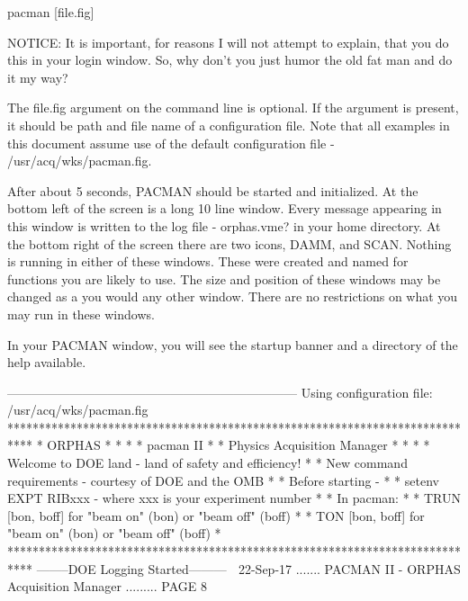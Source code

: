          pacman [file.fig]
 
     NOTICE:  It is important, for reasons I will not attempt to explain, that
          you do this in your login window. So, why don't you just  humor  the
          old fat man and do it my way?
 
   The  file.fig  argument on the command line is optional. If the argument is
   present, it should be path and file name  of  a  configuration  file.  Note
   that  all examples in this document assume use of the default configuration
   file - /usr/acq/wks/pacman.fig.
 
   After about 5 seconds, PACMAN should be started  and  initialized.  At  the
   bottom left of the screen is a long 10 line window. Every message appearing
   in  this  window  is  written  to  the  log file - orphas.vme? in your home
   directory. At the bottom right of the screen there  are  two  icons,  DAMM,
   and  SCAN.  Nothing  is  running  in  either  of  these windows. These were
   created and named for functions  you  are  likely  to  use.  The  size  and
   position  of  these windows may be changed as a you would any other window.
   There are no restrictions on what you may run in these windows.
 
   In your PACMAN window, you will see the startup banner and a  directory  of
   the help available.
 
     ---------------------------------------------------------------------
   Using configuration file: /usr/acq/wks/pacman.fig
   ****************************************************************************
   *                                ORPHAS                                    *
   *                                                                          *
   *                               pacman II                                  *
   *                      Physics Acquisition Manager                         *
   *                                                                          *
   *     Welcome to DOE land - land of safety and efficiency!                 *
   * New command requirements - courtesy of DOE and the OMB                   *
   * Before starting -                                                        *
   *   setenv EXPT RIBxxx - where xxx is your experiment number               *
   * In pacman:                                                               *
   *   TRUN [bon, boff]  for "beam on" (bon) or "beam off" (boff)             *
   *   TON  [bon, boff]  for "beam on" (bon) or "beam off" (boff)             *
   ****************************************************************************
     --------DOE Logging Started---------
    
   22-Sep-17 ....... PACMAN II - ORPHAS Acquisition Manager ......... PAGE   8
 
